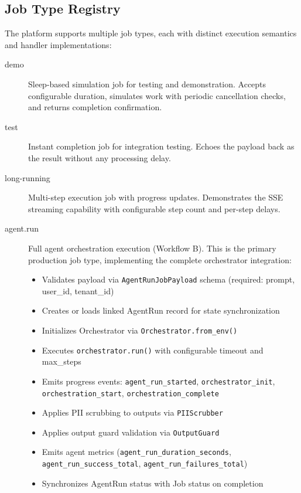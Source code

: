 \documentclass[a4paper,twoside]{sapthesis}
\begin{document}
\subsection{Job Type Registry}

The platform supports multiple job types, each with distinct execution semantics and handler implementations:

\begin{description}
    \item[demo] Sleep-based simulation job for testing and demonstration. Accepts configurable duration, simulates work with periodic cancellation checks, and returns completion confirmation.
    
    \item[test] Instant completion job for integration testing. Echoes the payload back as the result without any processing delay.
    
    \item[long-running] Multi-step execution job with progress updates. Demonstrates the SSE streaming capability with configurable step count and per-step delays.
    
    \item[agent.run] Full agent orchestration execution (Workflow B). This is the primary production job type, implementing the complete orchestrator integration:
    \begin{itemize}
        \item Validates payload via \texttt{AgentRunJobPayload} schema (required: prompt, user\_id, tenant\_id)
        \item Creates or loads linked AgentRun record for state synchronization
        \item Initializes Orchestrator via \texttt{Orchestrator.from\_env()}
        \item Executes \texttt{orchestrator.run()} with configurable timeout and max\_steps
        \item Emits progress events: \texttt{agent\_run\_started}, \texttt{orchestrator\_init}, \texttt{orchestration\_start}, \texttt{orchestration\_complete}
        \item Applies PII scrubbing to outputs via \texttt{PIIScrubber}
        \item Applies output guard validation via \texttt{OutputGuard}
        \item Emits agent metrics (\texttt{agent\_run\_duration\_seconds}, \texttt{agent\_run\_success\_total}, \texttt{agent\_run\_failures\_total})
        \item Synchronizes AgentRun status with Job status on completion
    \end{itemize}
\end{description}
\end{document}
